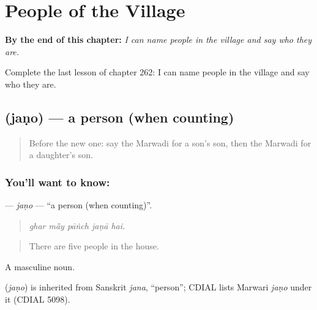 
\chapter{People of the Village}
\label{ch:mw-people-of-the-village}

\begin{chapteropening}
\textbf{By the end of this chapter:} \emph{I can name people in the village and say who they are.}

Complete the last lesson of chapter 262: I can name people in the village and say who they are.
\end{chapteropening}

\section[\texorpdfstring{\mw{जणो} (jaṇo)}{जणो (jaṇo)}]{ (jaṇo) — a person (when counting)}

\label{lesson:MW-C262-jano}



\begin{quote}
Before the new one: say the Marwadi for a son's son, then the Marwadi for a daughter's son.
\end{quote}

\subsection*{You'll want to know: }
\textbf{} — \emph{jaṇo} — \textquotedblleft{}a person (when counting)\textquotedblright{}.

\begin{quote}
    
\end{quote}

\begin{quote}
\emph{ghar mā̃y pāṅch jaṇā hai.}
\end{quote}

\begin{quote}
There are five people in the house.
\end{quote}

A masculine noun.

\begin{cousinweb}
\textbf{} (\emph{jaṇo}) is inherited from Sanskrit \emph{jana}, \textquotedblleft{}person\textquotedblright{}; CDIAL lists Marwari \emph{jaṇo} under it (CDIAL 5098).
\end{cousinweb}

